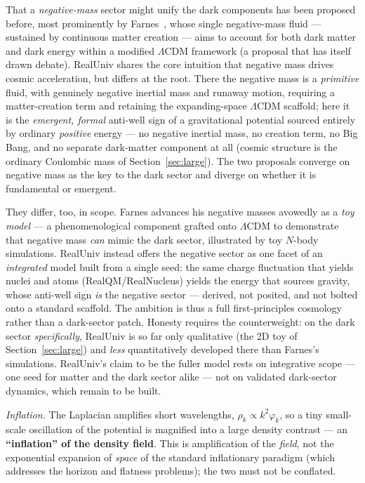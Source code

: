 \documentclass[11pt]{article}
\begin{document}
That a \emph{negative-mass} sector might unify the dark components has been proposed before, most prominently by
Farnes~\cite{farnes}, whose single negative-mass fluid --- sustained by continuous matter creation --- aims to
account for both dark matter and dark energy within a modified $\Lambda$CDM framework (a proposal that has itself
drawn debate). RealUniv shares the core intuition that negative mass drives cosmic acceleration, but differs at the
root. There the negative mass is a \emph{primitive} fluid, with genuinely negative inertial mass and runaway
motion, requiring a matter-creation term and retaining the expanding-space $\Lambda$CDM scaffold; here it is the
\emph{emergent, formal} anti-well sign of a gravitational potential sourced entirely by ordinary \emph{positive}
energy --- no negative inertial mass, no creation term, no Big Bang, and no separate dark-matter component at all
(cosmic structure is the ordinary Coulombic mass of Section~\ref{sec:large}). The two proposals converge on
negative mass as the key to the dark sector and diverge on whether it is fundamental or emergent.

They differ, too, in scope. Farnes advances his negative masses avowedly as a \emph{toy model} --- a
phenomenological component grafted onto $\Lambda$CDM to demonstrate that negative mass \emph{can} mimic the dark
sector, illustrated by toy $N$-body simulations. RealUniv instead offers the negative sector as one facet of an
\emph{integrated} model built from a single seed: the same charge fluctuation that yields nuclei and atoms
(RealQM/RealNucleus) yields the energy that sources gravity, whose anti-well sign \emph{is} the negative sector ---
derived, not posited, and not bolted onto a standard scaffold. The ambition is thus a full first-principles
cosmology rather than a dark-sector patch. Honesty requires the counterweight: on the dark sector
\emph{specifically}, RealUniv is so far only qualitative (the 2D toy of Section~\ref{sec:large}) and \emph{less}
quantitatively developed there than Farnes's simulations. RealUniv's claim to be the fuller model rests on
integrative scope --- one seed for matter and the dark sector alike --- not on validated dark-sector dynamics,
which remain to be built.

\emph{Inflation.} The Laplacian amplifies short wavelengths, $\rho_k\propto k^2\varphi_k$, so a tiny small-scale
oscillation of the potential is magnified into a large density contrast --- an \textbf{``inflation'' of the density
field}. This is amplification of the \emph{field}, not the exponential expansion of \emph{space} of the standard
inflationary paradigm (which addresses the horizon and flatness problems); the two must not be conflated.
\end{document}
